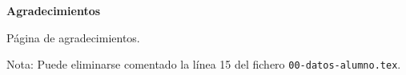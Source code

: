 \begin{center}
  \textbf{Agradecimientos}
\end{center}

Página de agradecimientos. 

Nota: Puede eliminarse comentado la línea 15 del fichero {\tt 00-datos-alumno.tex}.